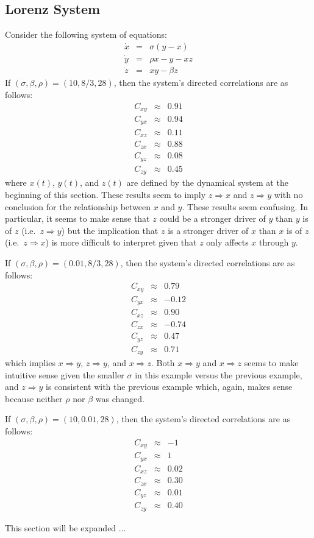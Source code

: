 \documentclass[a4paper,11pt]{article}
\begin{document}
\subsection{Lorenz System}
Consider the following system of equations:
\begin{eqnarray*}
\dot{x} &=& \sigma\left(y-x\right)\\
\dot{y} &=& \rho x-y-xz\\
\dot{z} &=& xy - \beta z
\end{eqnarray*}
If $(\sigma,\beta,\rho)=(10,8/3,28)$, then the system's directed correlations are as follows:
\begin{eqnarray*}
C_{xy} &\approx & 0.91\\
C_{yx} &\approx & 0.94\\
C_{xz} &\approx & 0.11\\
C_{zx} &\approx & 0.88\\
C_{yz} &\approx & 0.08\\
C_{zy} &\approx & 0.45
\end{eqnarray*}
where $x(t)$, $y(t)$, and $z(t)$ are defined by the dynamical system at the beginning of this section.  These results seem to imply $z\Rightarrow x$ and $z\Rightarrow y$ with no conclusion for the relationship between $x$ and $y$.  These results seem confusing.  In particular, it seems to make sense that $z$ could be a stronger driver of $y$ than $y$ is of $z$ (i.e.\ $z\Rightarrow y$) but the implication that $z$ is a stronger driver of $x$ than $x$ is of $z$ (i.e.\ $z\Rightarrow x$) is more difficult to interpret given that $z$ only affects $x$ through $y$.

If $(\sigma,\beta,\rho)=(0.01,8/3,28)$, then the system's directed correlations are as follows:
\begin{eqnarray*}
C_{xy} &\approx & 0.79\\
C_{yx} &\approx & -0.12\\
C_{xz} &\approx & 0.90\\
C_{zx} &\approx & -0.74\\
C_{yz} &\approx & 0.47\\
C_{zy} &\approx & 0.71
\end{eqnarray*}
which implies $x\Rightarrow y$, $z\Rightarrow y$, and $x\Rightarrow z$.  Both $x\Rightarrow y$ and $x\Rightarrow z$ seems to make intuitive sense given the smaller $\sigma$ in this example versus the previous example, and $z\Rightarrow y$ is consistent with the previous example which, again, makes sense because neither $\rho$ nor $\beta$ was changed.

If $(\sigma,\beta,\rho)=(10,0.01,28)$, then the system's directed correlations are as follows:
\begin{eqnarray*}
C_{xy} &\approx & -1\\
C_{yx} &\approx & 1\\
C_{xz} &\approx & 0.02\\
C_{zx} &\approx & 0.30\\
C_{yz} &\approx & 0.01\\
C_{zy} &\approx & 0.40
\end{eqnarray*}

This section will be expanded $\ldots$
\end{document}
